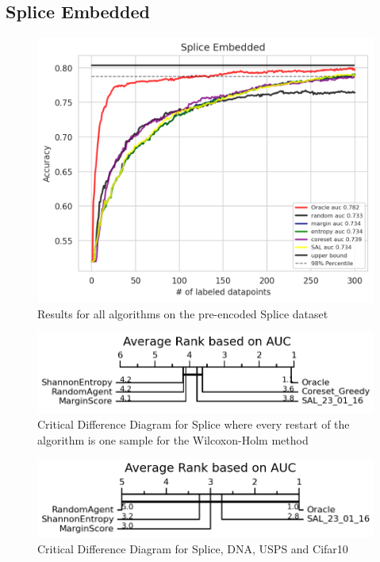 \documentclass[]{article}
\begin{document}
\subsection{Splice Embedded}
\begin{figure}[H]
	\centering
	\includegraphics[width=0.8\linewidth]{img/eval_splice_embedded}
	\caption{Results for all algorithms on the pre-encoded Splice dataset}
\end{figure}
\begin{figure}[H]
\centering
\includegraphics[width=0.8\linewidth]{img/eval_splice_embedded_cd}
\caption{Critical Difference Diagram for Splice where every restart of the algorithm is one sample for the Wilcoxon-Holm method}
\end{figure}
\begin{figure}[H]
\centering
\includegraphics[width=0.8\linewidth]{img/eval_macro}
\caption{Critical Difference Diagram for Splice, DNA, USPS and Cifar10}
\end{figure}



\end{document}
